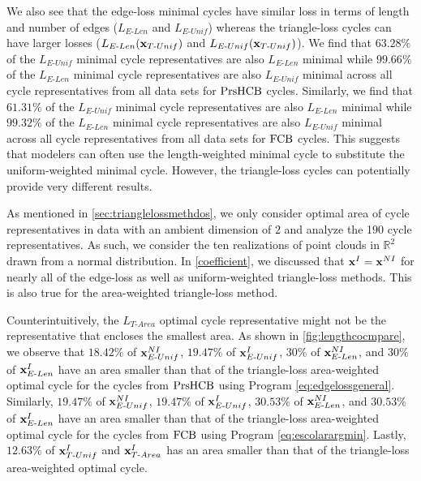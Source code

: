 We also see that the edge-loss minimal cycles have similar loss in terms of length and number of edges ($L_{E\text{-}Len}$ and $L_{E\text{-}Unif}$) whereas the triangle-loss cycles can have larger losses ($L_{E\text{-}Len}(\mathbf{x}_{T\text{-}Unif})$ and $L_{E\text{-}Unif}(\mathbf{x}_{T\text{-}Unif})$). We find that $63.28\%$ of the $L_{E\text{-}Unif}$ minimal cycle representatives are also $L_{E\text{-}Len}$ minimal while $99.66\%$ of the $L_{E\text{-}Len}$ minimal cycle representatives are also $L_{E\text{-}Unif}$ minimal across all cycle representatives from all data sets for $\mathrm{PrsHCB}$ cycles. Similarly, we find that $61.31\%$ of the $L_{E\text{-}Unif}$ minimal cycle representatives are also $L_{E\text{-}Len}$ minimal while $99.32\%$ of the $L_{E\text{-}Len}$ minimal cycle representatives are also $L_{E\text{-}Unif}$ minimal across all cycle representatives from all data sets for $\mathrm{FCB}$ cycles. This suggests that modelers can often use the length-weighted minimal cycle to substitute the uniform-weighted minimal cycle. However, the triangle-loss cycles can potentially provide very different results. 


As mentioned in \se \ref{sec:trianglelossmethdos}, we only consider optimal area of cycle representatives in data with an ambient dimension of $2$ and analyze the 190 cycle representatives. As such, we consider the ten realizations of point clouds in $\mathbb{R}^2$ drawn from a normal distribution. In \se \ref{coefficient}, we discussed that $\mathbf{x}^I = \mathbf{x}^{NI}$ for nearly all of the edge-loss as well as uniform-weighted triangle-loss methods. This is also true for the area-weighted triangle-loss method.


Counterintuitively, the $L_{T\text{-}Area}$ optimal cycle representative might not be the representative that encloses the smallest area. As shown in \fig\ref{fig:lengthcocmpare}, we observe that $18.42\%$ of $\mathbf{x}_{E\text{-}Unif}^{NI}$, $19.47\%$ of $\mathbf{x}_{E\text{-}Unif}^I$, $30\%$ of $\mathbf{x}_{E\text{-}Len}^{NI}$, and $30\%$ of  $\mathbf{x}_{E\text{-}Len}^I$ have an area smaller than that of the triangle-loss area-weighted optimal cycle for the cycles from $\mathrm{PrsHCB}$ using Program \eqref{eq:edgelossgeneral}. 
Similarly,  $19.47\%$ of $\mathbf{x}_{E\text{-}Unif}^{NI}$, $19.47\%$ of  $\mathbf{x}_{E\text{-}Unif}^I$, $30.53\%$ of $\mathbf{x}_{E\text{-}Len}^{NI}$, and $30.53\%$ of $\mathbf{x}_{E\text{-}Len}^I$ have an area smaller than that of the triangle-loss area-weighted optimal cycle for the cycles from $\mathrm{FCB}$ using Program \eqref{eq:escolarargmin}. Lastly, $12.63\%$ of $\mathbf{x}^{I}_{T\text{-}Unif}$ and $\mathbf{x}^{I}_{T\text{-}Area}$ has an area smaller than that of the triangle-loss area-weighted optimal cycle.  

